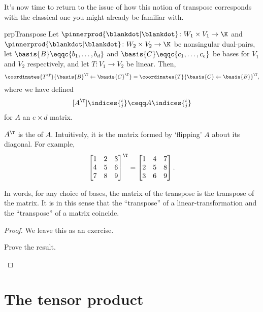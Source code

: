 It's now time to return to the issue of how this notion of transpose corresponds with the classical one you might already be familiar with. 
\begin{prp}{}{prpTranspose}
	Let $\pinnerprod{\blankdot |\blankdot}\colon W_1\times V_1\rightarrow \K$ and $\pinnerprod{\blankdot |\blankdot}\colon W_2\times V_2\rightarrow \K$ be nonsingular dual-pairs, let $\basis{B}\eqqc \{ b_1,\ldots ,b_d\}$ and $\basis{C}\eqqc \{ c_1,\ldots ,c_e\}$ be bases for $V_1$ and $V_2$ respectively, and let $T\colon V_1\rightarrow V_2$ be linear.  Then,
	\begin{equation}
		\coordinates{T^{\T}}{\basis{B}^{\T}\leftarrow \basis{C}^{\T}}=\coordinates{T}{\basis{C}\leftarrow \basis{B}}^{\T},
	\end{equation}
	where we have defined
	\begin{equation}\label{eqn5.2.72}
		[A^{\T}]\indices{^i_j}\ceqq A\indices{_j^i}
	\end{equation}
	for $A$ an $e\times d$ matrix.
	\begin{rmk}
		$A^{\T}$ is the  of $A$.  Intuitively, it is the matrix formed by `flipping' $A$ about its diagonal.  For example,
		\begin{equation}
		\begin{bmatrix}1 & 2 & 3 \\ 4 & 5 & 6 \\ 7 & 8 & 9\end{bmatrix}^{\T}=\begin{bmatrix}1 & 4 & 7 \\ 2 & 5 & 8 \\ 3 & 6 & 9\end{bmatrix}.
		\end{equation}
	\end{rmk}
	\begin{rmk}
		In words, for any choice of bases, the matrix of the transpose is the transpose of the matrix.  It is in this sense that the ``transpose'' of a linear-transformation and the ``transpose'' of a matrix coincide.
	\end{rmk}
	\begin{proof}
		We leave this as an exercise.
		\begin{exr}[breakable=false]{}{}
			Prove the result.
		\end{exr}
	\end{proof}
\end{prp}

\section{The tensor product}

